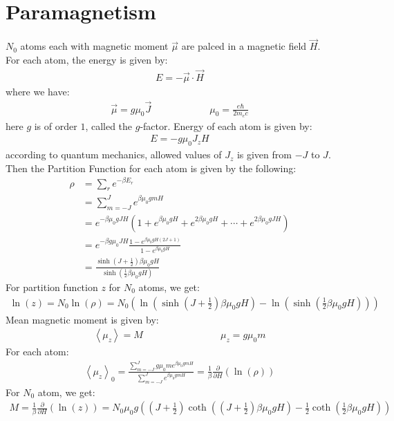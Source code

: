 \documentclass[11pt,oneside]{book}
\theoremstyle{break}
\theoremstyle{break}
\newcommand{\lr}[1]{\left( #1 \right)}
\begin{document}
\section[Paramagnetism]{\color{red}Paramagnetism\color{black}}
$N_0$ atoms each with magnetic moment $\vec{\mu}$ are palced in a magnetic field $\vec{H}$. \\
For each atom, the energy is given by:
\begin{align*}
E = -\vec{\mu}\cdot \vec{H}
\end{align*}
where we have:
\begin{align*}
\vec{\mu} = g\mu_0 \vec{J} \qquad\qquad\qquad \mu_0 =\frac{e\hbar}{2m_e c}
\end{align*}
here $g$ is of order $1$, called the $g$-factor. Energy of each atom is given by:
\begin{align*}
E = -g \mu_0 J_z H
\end{align*}
according to quantum mechanics, allowed values of $J_z$ is given from $-J$ to $J$. \\
Then the Partition Function for each atom is given by the following:
\begin{align*}
\rho &= \sum_r e^{-\beta E_r} \\
&= \sum_{m=-J}^{J} e^{\beta \mu_0 gmH}\\
&= e^{-\beta \mu_0 gJH} \lr{1+ e^{\beta \mu_0 gH}+ e^{2\beta \mu_0 gH}+\cdots + e^{2\beta \mu_0 gJH}} \\
&= e^{-\beta g\mu_0 JH} \frac{1- e^{\beta \mu_0 gH (2J+1)}}{1-e^{\beta \mu_0 gH}}\\
&= \frac{\sinh\lr{J+\frac{1}{2}}\beta \mu_0 gH}{\sinh\lr{\frac{1}{2}\beta \mu_0 gH}}
\end{align*}
For partition function $z$ for $N_0$ atoms, we get:
\begin{align*}
\ln(z) = N_0 \ln(\rho) = N_0 \lr{\ln\lr{\sinh\lr{J+\frac{1}{2}} \beta \mu_0 gH} - \ln\lr{\sinh\lr{\frac{1}{2}\beta \mu_0 gH}} }
\end{align*}
Mean magnetic moment is given by:
\begin{align*}
\left< \mu_z\right> = M \qquad\qquad\qquad\qquad \mu_z = g\mu_0 m
\end{align*}
For each atom:
\begin{align*}
\left< \mu_z \right>_0 = \frac{\sum_{m=-J}^{J} g\mu_0 me^{\beta \mu_0 gmH}}{\sum_{m=-J}^{J}e^{\beta \mu_0 gmH}} = \frac{1}{\beta}\frac{\partial }{\partial H}\lr{\ln(\rho)}
\end{align*}
For $N_0$ atom, we get:
\begin{align*}
M = \frac{1}{\beta}\frac{\partial}{\partial H}\lr{\ln(z)} = N_0 \mu_0 g\lr{\lr{J+\frac{1}{2}}\coth\lr{\lr{J+\frac{1}{2}}\beta \mu_0 gH}-\frac{1}{2}\coth\lr{\frac{1}{2}\beta\mu_0 gH}}
\end{align*}
\end{document}
